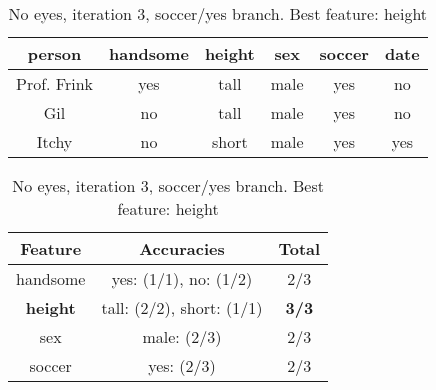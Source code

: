 \begin{table}[h!]
  \centering
  \begin{tabular}{ccccc|c}
    \toprule
    person      & handsome & height & sex    & soccer & date\\
    \midrule
    Prof. Frink & yes      & tall   & male   & yes    & no  \\
    Gil         & no       & tall   & male   & yes    & no  \\
    Itchy       & no       & short  & male   & yes    & yes \\
    \bottomrule
  \end{tabular}

  \vspace{.5cm}

  \begin{tabular}{ccc}
    \toprule
    Feature         & Accuracies                              & Total\\
    \midrule
    handsome        & yes: (1/1), no: (1/2)                   & 2/3\\
    \textbf{height} & tall: (2/2), short: (1/1)               & \textbf{3/3}\\
    sex             & male: (2/3)                             & 2/3\\
    soccer          & yes: (2/3)                              & 2/3\\
    \bottomrule
  \end{tabular}
  \caption*{No eyes, iteration 3, soccer/yes branch. Best feature: height}
\end{table}

